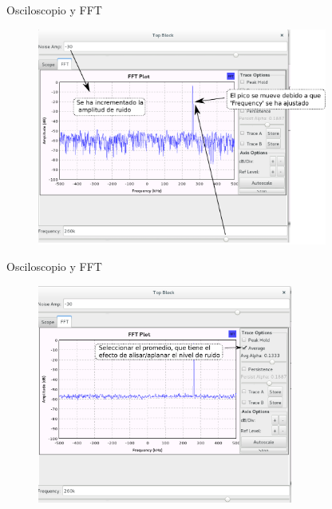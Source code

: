 \begin{frame}{Osciloscopio y FFT}
\begin{figure}[H]
\vspace{-3mm}
\centering
\includegraphics[width=0.85\textwidth]{parte1/lab2/pdf/lab2_10.pdf}
\end{figure}
\end{frame}

\begin{frame}{Osciloscopio y FFT}
\begin{figure}[H]
\vspace{-3mm}
\centering
\includegraphics[width=0.75\textwidth]{parte1/lab2/pdf/lab2_11.pdf}
\end{figure}
\end{frame}

